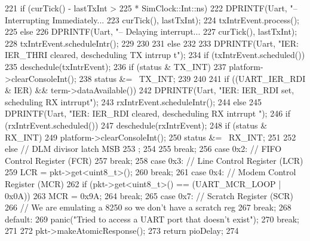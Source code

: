 \begin{DoxyCode}
{{{{221                     if (curTick() - lastTxInt > 225 * SimClock::Int::ns) {
222                         DPRINTF(Uart, "-- Interrupting Immediately... %
223                                 curTick(), lastTxInt);
224                         txIntrEvent.process();
225                     } else {
226                         DPRINTF(Uart, "-- Delaying interrupt... %
227                                 curTick(), lastTxInt);
228                         txIntrEvent.scheduleIntr();
229                     }
230                 }
231                 else
232                 {
233                     DPRINTF(Uart, "IER: IER_THRI cleared, descheduling TX intrrup
      t\n");
234                     if (txIntrEvent.scheduled())
235                         deschedule(txIntrEvent);
236                     if (status & TX_INT)
237                         platform->clearConsoleInt();
238                     status &= ~TX_INT;
239                 }
240 
241                 if ((UART_IER_RDI & IER) && term->dataAvailable()) {
242                     DPRINTF(Uart, "IER: IER_RDI set, scheduling RX intrrupt\n");
243                     rxIntrEvent.scheduleIntr();
244                 } else {
245                     DPRINTF(Uart, "IER: IER_RDI cleared, descheduling RX intrrupt
      \n");
246                     if (rxIntrEvent.scheduled())
247                         deschedule(rxIntrEvent);
248                     if (status & RX_INT)
249                         platform->clearConsoleInt();
250                     status &= ~RX_INT;
251                 }
252              } else { // DLM divisor latch MSB
253                 ;
254             }
255             break;
256         case 0x2: // FIFO Control Register (FCR)
257             break;
258         case 0x3: // Line Control Register (LCR)
259             LCR = pkt->get<uint8_t>();
260             break;
261         case 0x4: // Modem Control Register (MCR)
262             if (pkt->get<uint8_t>() == (UART_MCR_LOOP | 0x0A))
263                     MCR = 0x9A;
264             break;
265         case 0x7: // Scratch Register (SCR)
266             // We are emulating a 8250 so we don't have a scratch reg
267             break;
268         default:
269             panic("Tried to access a UART port that doesn't exist\n");
270             break;
271     }
272     pkt->makeAtomicResponse();
273     return pioDelay;
274 }
\end{DoxyCode}


